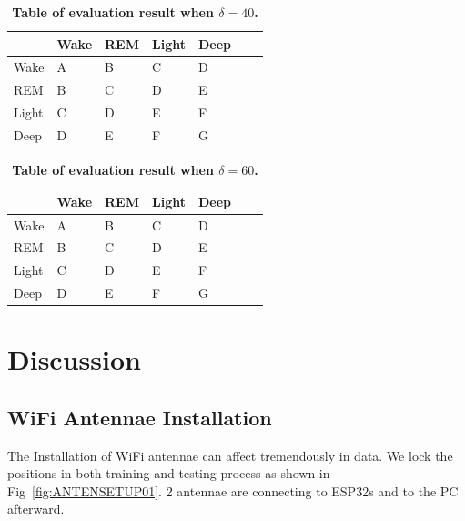 \documentclass[10pt,letterpaper]{article}
\begin{document}
\begin{table}[!ht]
	\begin{adjustwidth}{-2.25in}{0in} %
		\centering
		\caption{
			{\bf Table of evaluation result when $\delta=40$.}}
		\begin{tabular}{l|llllll}
			&Wake & REM &Light &Deep \\[1pt]
			\hline
			Wake &A &B &C &D \\[1pt]
			REM &B &C &D &E \\[1pt]
			Light &C &D &E &F \\[1pt]
			Deep &D &E &F &G \\[1pt]
		\end{tabular}
		\label{table:resultSigma40}
	\end{adjustwidth}
\end{table}

\begin{table}[!ht]
	\begin{adjustwidth}{-2.25in}{0in} %
		\centering
		\caption{
			{\bf Table of evaluation result when $\delta=60$.}}
		\begin{tabular}{l|llllll}
			&Wake & REM &Light &Deep \\[1pt]
			\hline
			Wake &A &B &C &D \\[1pt]
			REM &B &C &D &E \\[1pt]
			Light &C &D &E &F \\[1pt]
			Deep &D &E &F &G \\[1pt]
		\end{tabular}
		\label{table:resultSigma60}
	\end{adjustwidth}
\end{table}

\section*{Discussion}

\subsection*{WiFi Antennae Installation}

	The Installation of WiFi antennae can affect tremendously in data. We lock the positions in both training and testing process as shown in Fig~\ref{fig:ANTENSETUP01}.
	2 antennae are connecting to ESP32s and to the PC afterward.
	
\end{document}
